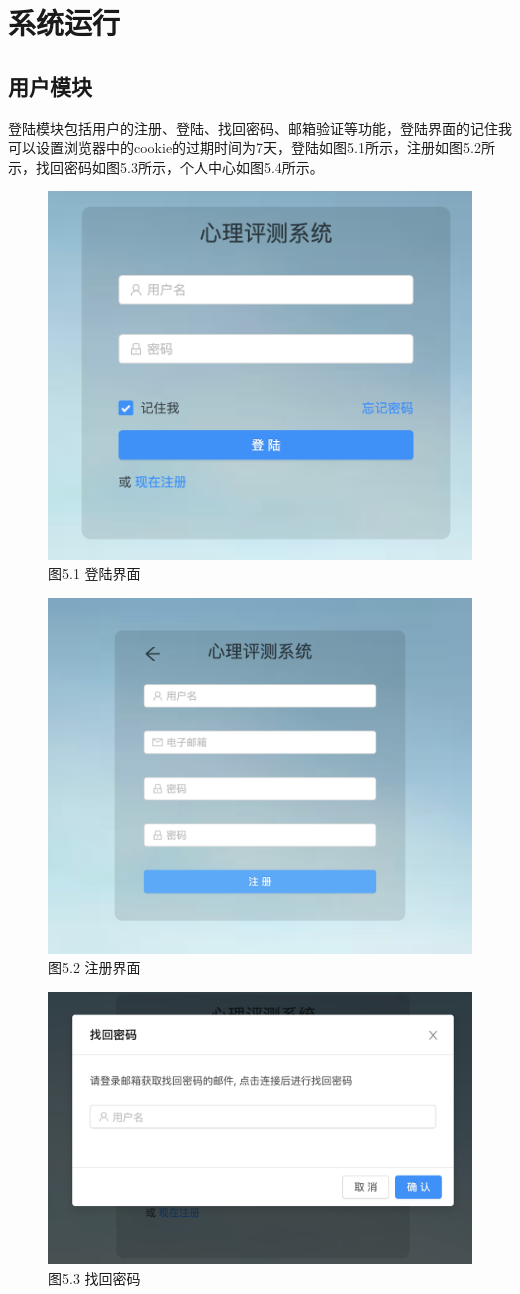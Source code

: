 \section{系统运行}

\subsection{用户模块}

登陆模块包括用户的注册、登陆、找回密码、邮箱验证等功能，登陆界面的记住我可以设置浏览器中的cookie的过期时间为7天，登陆如图5.1所示，注册如图5.2所示，找回密码如图5.3所示，个人中心如图5.4所示。

\begin{figure}[thbp!]
	\centering
	\includegraphics[width=0.6\linewidth]{figure/login}
	\label{fig:login} \\
	图5.1 登陆界面
\end{figure}

\begin{figure}[thbp!]
	\centering
	\includegraphics[width=0.5\linewidth]{figure/register}
	\label{fig:register} \\
	图5.2 注册界面
\end{figure}

\begin{figure}[thbp!]
	\centering
	\includegraphics[height=0.35\linewidth]{figure/find_password}
	\label{fig:find_password} \\
	图5.3 找回密码
\end{figure}

